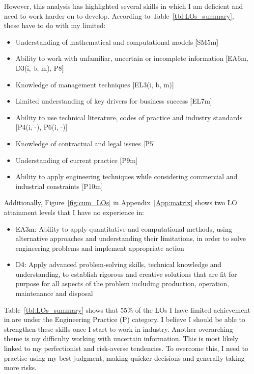 However, this analysis has highlighted several skills in which I am deficient and need to work harder on to develop.
According to Table~\ref{tbl:LOs_summary}, these have to do with my limited:
\begin{itemize}
	\item Understanding of mathematical and computational models [SM5m]
	\item Ability to work with unfamiliar, uncertain or incomplete information [EA6m, D3(i, b, m), P8]
	\item Knowledge of management techniques [EL3(i, b, m)]
	\item Limited understanding of key drivers for business success [EL7m]
	\item Ability to use technical literature, codes of practice and industry standards [P4(i, -), P6(i, -)]
	\item Knowledge of contractual and legal issues [P5]
	\item Understanding of current practice [P9m]
	\item Ability to apply engineering techniques while considering commercial and industrial constraints [P10m]
\end{itemize}

Additionally, Figure~\ref{fig:cum_LOs} in Appendix~\ref{App:matrix} shows two LO attainment levels that I have no experience in:
\begin{itemize}
	\item EA3m: Ability to apply quantitative and computational methods, using alternative approaches and understanding their limitations, in order to solve engineering problems and implement appropriate action
	\item D4: Apply advanced problem-solving skills, technical knowledge and understanding, to establish rigorous and creative solutions that are fit for purpose for all aspects of the problem including production, operation, maintenance and disposal
\end{itemize}


Table~\ref{tbl:LOs_summary} shows that 55\% of the LOs I have limited achievement in are under the Engineering Practice (P) category.
I believe I should be able to strengthen these skills once I start to work in industry.
Another overarching theme is my difficulty working with uncertain information.
This is most likely linked to my perfectionist and risk-averse tendencies.
To overcome this, I need to practise using my best judgment, making quicker decisions and generally taking more risks.